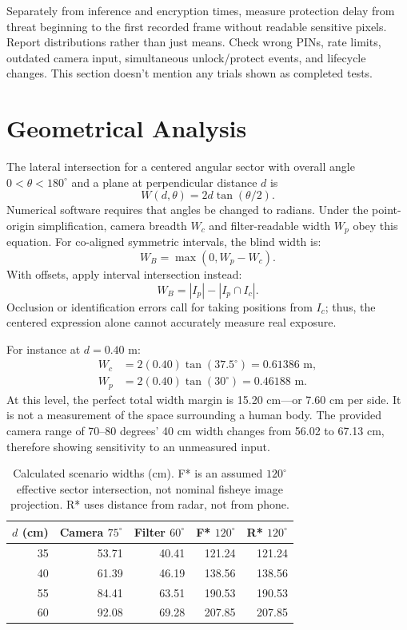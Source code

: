 \documentclass[conference]{IEEEtran}
\newcommand{\degc}{^{\circ}}
\begin{document}
Separately from inference and encryption times, measure protection delay from threat beginning to the first recorded frame without readable sensitive pixels. Report distributions rather than just means. Check wrong PINs, rate limits, outdated camera input, simultaneous unlock/protect events, and lifecycle changes. This section doesn't mention any trials shown as completed tests.

\section{Geometrical Analysis}
The lateral intersection for a centered angular sector with overall angle $0<\theta<180\degc$ and a plane at perpendicular distance $d$ is
\begin{equation}
W(d,\theta)=2d\tan(\theta/2).
\end{equation}
Numerical software requires that angles be changed to radians. Under the point-origin simplification, camera breadth $W_c$ and filter-readable width $W_p$ obey this equation. For co-aligned symmetric intervals, the blind width is:
\begin{equation}
W_B=\max(0,W_p-W_c).
\end{equation}
With offsets, apply interval intersection instead:
\begin{equation}
W_B=|I_p|-|I_p\cap I_c|.
\end{equation}
Occlusion or identification errors call for taking positions from $I_c$; thus, the centered expression alone cannot accurately measure real exposure.

For instance at $d=0.40$ m:
\begin{align}
W_c&=2(0.40)\tan(37.5\degc)=0.61386\text{ m},\\
W_p&=2(0.40)\tan(30\degc)=0.46188\text{ m}.
\end{align}
At this level, the perfect total width margin is 15.20 cm—or 7.60 cm per side. It is not a measurement of the space surrounding a human body. The provided camera range of 70--80 degrees' 40 cm width changes from 56.02 to 67.13 cm, therefore showing sensitivity to an unmeasured input.

\begin{table}[t]\caption{Calculated scenario widths (cm). F* is an assumed $120\degc$ effective sector intersection, not nominal fisheye image projection. R* uses distance from radar, not from phone.}\label{tab:widths}\centering
\begin{tabular}{rrrrr}\toprule
$d$ (cm)&Camera $75\degc$&Filter $60\degc$&F* $120\degc$&R* $120\degc$\\\midrule
35&53.71&40.41&121.24&121.24\\
40&61.39&46.19&138.56&138.56\\
55&84.41&63.51&190.53&190.53\\
60&92.08&69.28&207.85&207.85\\\bottomrule
\end{tabular}\end{table}
\end{document}
